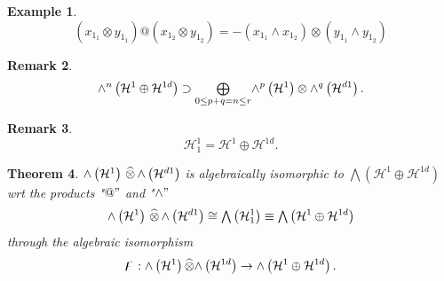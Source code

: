 \documentclass[aps,preprint]{revtex4}%
\newtheorem{theorem}{Theorem}
\newtheorem{example}[theorem]{Example}
\newtheorem{remark}[theorem]{Remark}
\begin{document}
\begin{example}%
\begin{equation}
\left(  x_{1_{1}}\otimes y_{1_{1}}\right)  @\left(  x_{1_{2}}\otimes y_{1_{2}%
}\right)  =-\left(  x_{1_{1}}\wedge x_{1_{2}}\right)  \otimes\left(  y_{1_{1}%
}\wedge y_{1_{2}}\right)
\end{equation}

\end{example}

\begin{remark}%
\begin{equation}
{\huge \wedge}^{n}\left(  \mathcal{H}^{1}\oplus\mathcal{H}^{1d}\right)
\supset%
{\textstyle\bigoplus\limits_{0\leq p+q=n\leq r}}
{\huge \wedge}^{p}\left(  \mathcal{H}^{1}\right)  \otimes{\huge \wedge}%
^{q}\left(  \mathcal{H}^{d1}\right)  .
\end{equation}

\end{remark}

\begin{remark}%
\begin{equation}
\mathcal{H}_{1}^{1}=\mathcal{H}^{1}\oplus\mathcal{H}^{1d}.
\end{equation}

\end{remark}

\begin{theorem}
${\huge \wedge}\left(  \mathcal{H}^{1}\right)  \,\widehat{\otimes
}\,{\huge \wedge}\left(  \mathcal{H}^{d1}\right)  $ is algebraically
isomorphic to $%
{\textstyle\bigwedge}
\left(  \mathcal{H}^{1}\oplus\mathcal{H}^{1d}\right)  $ wrt the products "$@"$
and "$\wedge"$
\begin{equation}
{\huge \wedge}\left(  \mathcal{H}^{1}\right)  \,\widehat{\otimes
}\,{\huge \wedge}\left(  \mathcal{H}^{d1}\right)  \cong%
{\textstyle\bigwedge}
\left(  \mathcal{H}_{1}^{1}\right)  \equiv%
{\textstyle\bigwedge}
\left(  \mathcal{H}^{1}\oplus\mathcal{H}^{1d}\right)
\end{equation}
through the algebraic isomorphism
\begin{equation}
\digamma:{\huge \wedge}\left(  \mathcal{H}^{1}\right)  \widehat{\otimes
}{\huge \wedge}\left(  \mathcal{H}^{1d}\right)  \rightarrow{\huge \wedge
}\left(  \mathcal{H}^{1}\oplus\mathcal{H}^{1d}\right)  .
\end{equation}

\end{theorem}
\end{document}
